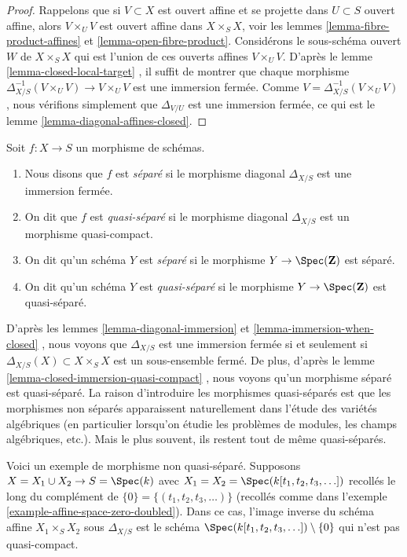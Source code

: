 \begin{proof}
Rappelons que si  $V \subset X$  est ouvert affine et se projette dans  $U \subset S$ 
ouvert affine, alors  $V \times_U V$  est ouvert affine dans  $X \times_S X$, voir les
lemmes  \ref{lemma-fibre-product-affines}  et  \ref{lemma-open-fibre-product}. Considérons le sous-schéma ouvert
 $W$  de  $X \times_S X$  qui est l'union de ces ouverts affines  $V \times_U V$.
D'après le lemme  \ref{lemma-closed-local-target} , il suffit de montrer que chaque morphisme
 $\Delta_{X/S}^{-1}(V \times_U V) \to V \times_U V$  est une immersion fermée. Comme  $V = \Delta_{X/S}^{-1}(V \times_U V)$ , nous vérifions
simplement que  $\Delta_{V/U}$  est une immersion fermée, ce qui est le lemme
 \ref{lemma-diagonal-affines-closed}.
\end{proof}

\begin{definition}
\label{definition-separated}
Soit  $f : X \to S$  un morphisme de schémas.
\begin{enumerate}
\item Nous disons que  $f$  est  {\it  séparé}  si le
morphisme diagonal  $\Delta_{X/S}$  est une immersion fermée.
\item On dit que  $f$  est  {\it  quasi-séparé}  si
le morphisme diagonal  $\Delta_{X/S}$  est un morphisme quasi-compact.
\item On dit qu'un schéma  $Y$  est  {\it  séparé} 
si le morphisme  $Y \to \Spec(\mathbf{Z})$  est séparé.
\item On dit qu'un schéma  $Y$  est  {\it 
quasi-séparé}  si le morphisme  $Y \to \Spec(\mathbf{Z})$  est quasi-séparé.
\end{enumerate}
\end{definition}

\noindent
D'après les lemmes  \ref{lemma-diagonal-immersion}  et  \ref{lemma-immersion-when-closed} , nous voyons que  $\Delta_{X/S}$  est
une immersion fermée si et seulement si  $\Delta_{X/S}(X) \subset X \times_S X$  est un sous-ensemble fermé.
De plus, d'après le lemme  \ref{lemma-closed-immersion-quasi-compact} , nous voyons qu'un morphisme séparé est
quasi-séparé. La raison d'introduire les morphismes quasi-séparés est que les
morphismes non séparés apparaissent naturellement dans l'étude des variétés
algébriques (en particulier lorsqu'on étudie les problèmes de modules, les champs
algébriques, etc.). Mais le plus souvent, ils restent tout de même quasi-séparés.

\begin{example}
\label{example-not-quasi-separated}
Voici un exemple de morphisme non quasi-séparé. Supposons  $X = X_1 \cup X_2 \to S = \Spec(k)$  avec
 $X_1 = X_2 = \Spec(k[t_1, t_2, t_3, \ldots])$  recollés le long du complément de  $\{0\} = \{(t_1, t_2, t_3, \ldots)\}$  (recollés comme dans
l'exemple  \ref{example-affine-space-zero-doubled}). Dans ce cas, l'image inverse du schéma affine
 $X_1 \times_S X_2$  sous  $\Delta_{X/S}$  est le schéma  $\Spec(k[t_1, t_2, t_3, \ldots]) \setminus \{0\}$  qui n'est pas
quasi-compact.
\end{example}

